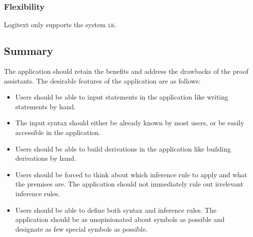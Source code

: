 \subsubsection{Flexibility}
Logitext only supports the system \textsc{lk}.

\subsection{Summary}
The application should retain the benefits and address the drawbacks of the proof assistants. The desirable features of the application are as follows:
\begin{itemize}
    \item Users should be able to input statements in the application like writing statements by hand.
    \item The input syntax should either be already known by most users, or be easily accessible in the application.
    \item Users should be able to build derivations in the application like building derivations by hand.
    \item Users should be forced to think about which inference rule to apply and what the premises are. The application should not immediately rule out irrelevant inference rules.
    \item Users should be able to define both syntax and inference rules. The application should be as unopinionated about symbols as possible and designate as few special symbols as possible.
\end{itemize}